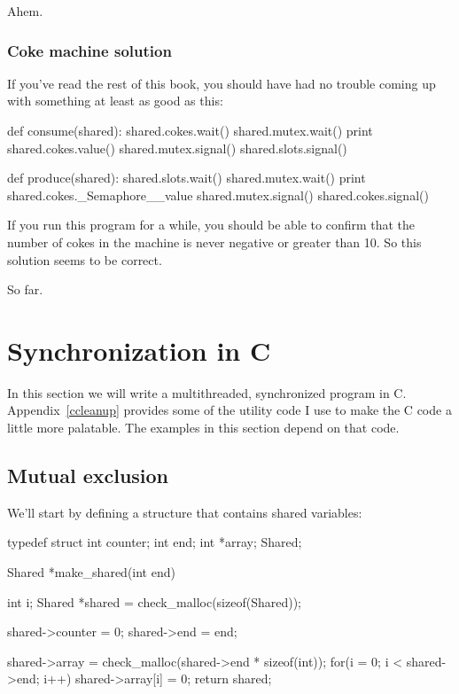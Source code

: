 \documentclass{book}
\begin{document}
Ahem.



\subsection {Coke machine solution}

If you've read the rest of this book, you should have had no
trouble coming up with something at least as good as this:

\begin{unbreakable}[]{}
def consume(shared):
    shared.cokes.wait()
    shared.mutex.wait()
    print shared.cokes.value()
    shared.mutex.signal()
    shared.slots.signal()

def produce(shared):
    shared.slots.wait()
    shared.mutex.wait()
    print shared.cokes._Semaphore__value
    shared.mutex.signal()
    shared.cokes.signal()
\end{unbreakable}

If you run this program for a while, you should be able to confirm
that the number of cokes in the machine is never negative or greater
than 10.  So this solution seems to be correct.

So far.


\chapter{Synchronization in C}
\label{csync}

In this section we will write a multithreaded, synchronized
program in C.  Appendix~\ref{ccleanup} provides some of the utility
code I use to make the C code a little more palatable.  The
examples in this section depend on that code.

\section{Mutual exclusion}

We'll start by defining a structure that contains shared
variables:

\begin{unbreakable}[]{}
typedef struct {
  int counter;
  int end;
  int *array;
} Shared;

Shared *make_shared(int end) {
 int i;
 Shared *shared = 
    check_malloc(sizeof(Shared));

 shared->counter = 0;
 shared->end = end;

 shared->array = 
  check_malloc(shared->end * sizeof(int));
 for(i = 0; i < shared->end; i++) {
  shared->array[i] = 0;
 }
 return shared;
}
\end{unbreakable}
\end{document}
